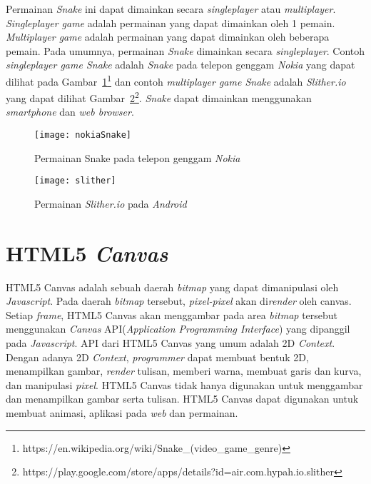 Permainan \textit{Snake} ini dapat dimainkan secara \textit{singleplayer} atau \textit{multiplayer}. \textit{Singleplayer game} adalah permainan yang dapat dimainkan oleh 1 pemain. \textit{Multiplayer game} adalah permainan yang dapat dimainkan oleh beberapa pemain. Pada umumnya, permainan \textit{Snake} dimainkan secara \textit{singleplayer}. Contoh \textit{singleplayer game Snake} adalah \textit{Snake} pada telepon genggam \textit{Nokia} yang dapat dilihat pada Gambar~\ref{fig:nokiaSnake}\footnote{https://en.wikipedia.org/wiki/Snake\_(video\_game\_genre)} dan contoh \textit{multiplayer game Snake} adalah \textit{Slither.io} yang dapat dilihat Gambar~\ref{fig:slither}\footnote{https://play.google.com/store/apps/details?id=air.com.hypah.io.slither}. \textit{Snake} dapat dimainkan menggunakan \textit{smartphone} dan \textit{web browser}.  

\begin{figure}[H]
	\centering  
	\texttt{[image: nokiaSnake]}  
	\caption[Permainan Snake pada telepon genggam \textit{Nokia}]{Permainan Snake pada telepon genggam \textit{Nokia}} 
	\label{fig:nokiaSnake} 
\end{figure} 

\begin{figure}[H]
	\centering  
	\texttt{[image: slither]}  
	\caption[Permainan \textit{Slither.io} pada \textit{Android}]{Permainan \textit{Slither.io} pada \textit{Android}} 
	\label{fig:slither} 
\end{figure} 

\section{HTML5 \textit{Canvas}}
\label{sec:HTML5Canvas}
HTML5 Canvas adalah sebuah daerah \textit{bitmap} yang dapat dimanipulasi oleh \textit{Javascript}. Pada daerah \textit{bitmap} tersebut, \textit{pixel-pixel} akan di\textit{render} oleh canvas. Setiap \textit{frame}, HTML5 Canvas akan menggambar pada area \textit{bitmap} tersebut menggunakan \textit{Canvas} API(\textit{Application Programming Interface}) yang dipanggil pada \textit{Javascript}. API dari HTML5 Canvas yang umum adalah 2D \textit{Context}. Dengan adanya 2D \textit{Context}, \textit{programmer} dapat membuat bentuk 2D, menampilkan gambar, \textit{render} tulisan, memberi warna, membuat garis dan kurva, dan manipulasi \textit{pixel}. HTML5 Canvas tidak hanya digunakan untuk menggambar dan menampilkan gambar serta tulisan. HTML5 Canvas dapat digunakan untuk membuat animasi, aplikasi pada \textit{web} dan permainan. 

